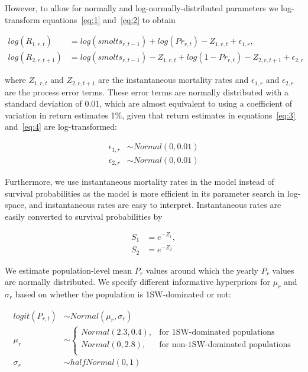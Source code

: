 \documentclass[12pt]{article}
\newcommand{\Pg}{$P_r$\xspace}
\newcommand{\prmu}{$\mu_r$\xspace}
\newcommand{\prsig}{$\sigma_r$\xspace}
\begin{document}
However, to allow for normally and log-normally-distributed parameters we
log-transform equations~\ref{eq:1} and~\ref{eq:2} to obtain

\begin{align}
    log(R_{1,r,t}) &= log(smolts_{r,t-1}) + log(Pr_{r,t}) - Z_{1,r,t} + \epsilon_{1,r} \label{eq:3}, \\
    log(R_{2,r,t+1}) &= log(smolts_{r,t-1}) - Z_{1,r,t} + log(1 - Pr_{r,t})  - Z_{2,r,t+1} + \epsilon_{2,r} \label{eq:4} 
\end{align}

where $Z_{1,r,t}$ and $Z_{2,r,t+1}$ are the instantaneous mortality rates and $\epsilon_{1,r}$ and $\epsilon_{2,r}$
are the process error terms. 
These error terms are normally distributed with a standard deviation
of 0.01, which are almost equivalent to using a coefficient of variation in
return estimates 1\%, given that return estimates in equations~\ref{eq:3}
and~\ref{eq:4} are log-transformed:

\begin{align}
\epsilon_{1,r} &\sim Normal(0, 0.01) \\
\epsilon_{2,r} &\sim Normal(0, 0.01)
\end{align}

Furthermore, we use instantaneous mortality rates in the model instead of survival probabilities
as the model is more efficient in its parameter search in log-space, and instantaneous rates
are easy to interpret. Instantaneous rates are easily converted to survival probabilities by 

\begin{align}
 S_{1} &= e^{-Z_1}, \\
 S_{2} &= e^{-Z_2} 
\end{align}

We estimate population-level mean \Pg values around which the yearly \Pg
values are normally distributed. We specify different informative hyperpriors
for \prmu and \prsig based on whether the population is 1SW-dominated or not:

\begin{align}
    logit(P_{r,t}) &\sim Normal(\mu_r, \sigma_r) \\
    \mu_r &\sim 
    \begin{cases}
       Normal(2.3, 0.4),  &\text{for 1SW-dominated populations} \\
       Normal(0, 2.8), &\text{for non-1SW-dominated populations} \\
   \end{cases} \\
    \sigma_r &\sim halfNormal(0, 1)
\end{align}
\end{document}
